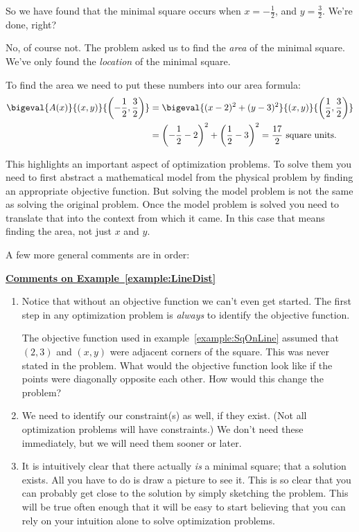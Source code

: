 \begin{myexample}
  So we have found that the minimal square occurs when $x=-\frac12$,
  and $y=\frac32$. We're done, right?

  No, of course not. The problem asked us to find the \emph{area} of
  the minimal square. We've only found the \emph{location} of the
  minimal square.

  To find the area we need to put these numbers into our area formula:
  \begin{align*}
    \bigeval{A(x)}{\left(x,y\right)}{\left(-\frac12,\frac32\right)}&=\bigeval{(x-2)^2+(y-3)^2}{(x,y)}{\left(\frac{1}{2},\frac32\right)}\\
        &=\left(-\frac12-2\right)^2+\left(\frac12-3\right)^2=\frac{17}{2}\text{ square units.}
  \end{align*}

  This highlights an important aspect of optimization problems.  To
  solve them you need to first abstract a mathematical model from the
  physical problem by finding an appropriate objective function. But
  solving the model problem is not the same as solving the original
  problem. Once the model problem is solved you need to translate that
  into the context from which it came. In this case that means finding
  the area, not just $x$ and $y$.

A few more general comments are in order:

  \centerline{\bf{}\underline{Comments on  Example~\ref{example:LineDist}}}
  \begin{enumerate}
  \item Notice that without an objective function we can't even get
    started. The first step in any optimization problem is \emph{always}
    to identify the objective function.
    \begin{embeddedproblem}
      The objective function used in example~\ref{example:SqOnLine}
      assumed that $(2,3)$ and $(x,y)$ were adjacent corners of the
      square.  This was never stated in the problem. What would the
      objective function look like if the points were diagonally
      opposite each other.  How would this change the problem?
    \end{embeddedproblem}
  \item We need to identify our constraint(s) as well, if they
    exist. (Not all optimization problems will have constraints.)  We
    don't need these immediately, but we will need them sooner or later.
  \item It is intuitively clear that there actually \emph{is} a
    minimal square; that a solution exists. All you have to do is draw
    a picture to see it.  This is so clear that you can probably get
    close to the solution by simply sketching the problem. This will
    be true often enough that it will be easy to start believing that
    you can rely on your intuition alone to solve optimization
    problems.


\end{enumerate}
\end{myexample}
